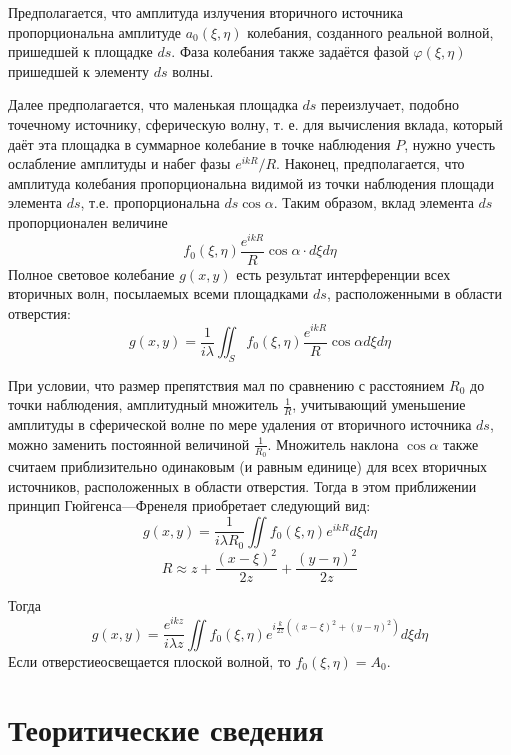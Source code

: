 Предполагается, что амплитуда излучения вторичного источника пропорциональна амплитуде $a_{0}(\xi, \eta)$  колебания, созданного реальной волной, пришедшей к площадке $ds$. Фаза колебания также задаётся фазой $ \varphi( \xi, \eta)$ пришедшей к элементу $ds$ волны.

Далее предполагается, что маленькая площадка $ds$ переизлучает, подобно точечному источнику, сферическую волну, т. е. для вычисления вклада, который даёт эта площадка в суммарное колебание в точке наблюдения $P$,  нужно учесть ослабление амплитуды и набег фазы $e^{ikR}/R$. Наконец, предполагается, что амплитуда колебания пропорциональна видимой из точки наблюдения площади элемента $ds$, т.е. пропорциональна $ds\cos\alpha$. Таким образом, вклад элемента $ds$ пропорционален величине
\[
    f_{0}(\xi, \eta)\frac{e^{ikR}}{R}\cos\alpha\cdot d\xi d\eta
\]
Полное световое колебание $g(x, y)$ есть результат интерференции всех вторичных волн, посылаемых всеми площадками $ds$, расположенными в области отверстия:
\[
    g(x, y) = \frac{1}{i\lambda}\iint_{S} f_{0}(\xi, \eta)\frac{e^{ikR}}{R}\cos\alpha d\xi d\eta
\]

При условии, что размер препятствия мал по сравнению с расстоянием $R_{0}$ до точки наблюдения, амплитудный множитель $\frac{1}{R}$,  учитывающий уменьшение амплитуды в сферической волне по мере удаления от вторичного источника $ds$, можно заменить постоянной величиной $\frac{1}{R_{0}}$. Множитель наклона $\cos\alpha$ также считаем приблизительно одинаковым (и равным единице) для всех вторичных источников, расположенных в области отверстия. Тогда в этом приближении принцип Гюйгенса—Френеля приобретает следующий вид:
\[
    g(x, y) = \frac{1}{i\lambda R_{0}} \iint f_{0}(\xi, \eta)e^{ikR} d\xi d\eta
\]
\[
    R \approx z + \frac{\left(x - \xi\right)^{2}}{2z} + \frac{\left(y - \eta\right)^{2}}{2z}
\]

Тогда
\[
    g(x, y) = \frac{e^{ikz}}{i \lambda z}\iint f_{0}(\xi, \eta)e^{i\frac{k}{2z}\left(\left(x-\xi\right)^{2} + \left(y - \eta\right)^{2}\right)} d\xi d\eta
\]
Если отверстиеосвещается плоской волной, то $f_{0}(\xi, \eta) = A_{0}$.

\section{Теоритические сведения}

